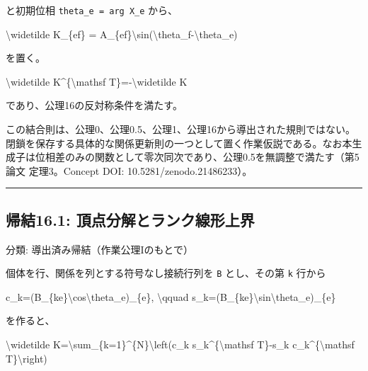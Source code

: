 \documentclass[
  a4paper,
]{ltjsarticle}
\newenvironment{Shaded}{}{}
\newcommand{\NormalTok}[1]{#1}
\begin{document}
と初期位相 \texttt{theta\_e\ =\ arg\ X\_e} から、

\begin{Shaded}
\begin{Highlighting}[]
\NormalTok{\textbackslash{}widetilde K\_\{ef\}}
\NormalTok{=}
\NormalTok{A\_\{ef\}\textbackslash{}sin(\textbackslash{}theta\_f{-}\textbackslash{}theta\_e)}
\end{Highlighting}
\end{Shaded}

を置く。

\begin{Shaded}
\begin{Highlighting}[]
\NormalTok{\textbackslash{}widetilde K\^{}\{\textbackslash{}mathsf T\}={-}\textbackslash{}widetilde K}
\end{Highlighting}
\end{Shaded}

であり、公理16の反対称条件を満たす。

この結合則は、公理0、公理0.5、公理1、公理16から導出された規則ではない。閉鎖を保存する具体的な関係更新則の一つとして置く作業仮説である。なお本生成子は位相差のみの関数として零次同次であり、公理0.5を無調整で満たす（第5論文
定理3。Concept DOI: 10.5281/zenodo.21486233）。

\begin{center}\rule{0.5\linewidth}{0.5pt}\end{center}

\subsection{帰結16.1:
頂点分解とランク線形上界}\label{ux5e30ux7d5016.1-ux9802ux70b9ux5206ux89e3ux3068ux30e9ux30f3ux30afux7ddaux5f62ux4e0aux754c}

分類: 導出済み帰結（作業公理Iのもとで）

個体を行、関係を列とする符号なし接続行列を \texttt{B} とし、その第
\texttt{k} 行から

\begin{Shaded}
\begin{Highlighting}[]
\NormalTok{c\_k=(B\_\{ke\}\textbackslash{}cos\textbackslash{}theta\_e)\_\{e\},}
\NormalTok{\textbackslash{}qquad}
\NormalTok{s\_k=(B\_\{ke\}\textbackslash{}sin\textbackslash{}theta\_e)\_\{e\}}
\end{Highlighting}
\end{Shaded}

を作ると、

\begin{Shaded}
\begin{Highlighting}[]
\NormalTok{\textbackslash{}widetilde K=\textbackslash{}sum\_\{k=1\}\^{}\{N\}\textbackslash{}left(c\_k s\_k\^{}\{\textbackslash{}mathsf T\}{-}s\_k c\_k\^{}\{\textbackslash{}mathsf T\}\textbackslash{}right)}
\end{Highlighting}
\end{Shaded}
\end{document}
